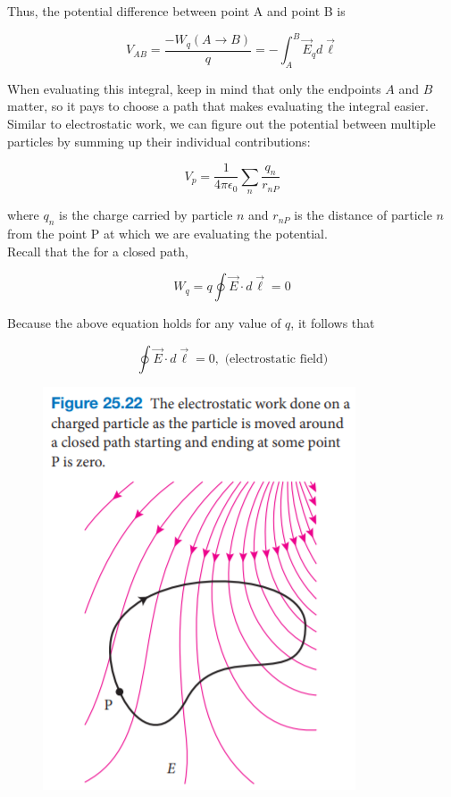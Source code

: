         Thus, the potential difference between point A and point B is

        \[
            V_{AB} = \frac{-W_q (A\to B)}{q} = -\int_A^B \vec{E}_q d\vec{\ell}
        \]

        When evaluating this integral, keep in mind that only the endpoints $A$ and $B$ matter, so it pays to choose a path that makes evaluating the integral easier. \\

        Similar to electrostatic work, we can figure out the potential between multiple particles by summing up their individual contributions:

        \[
            V_p = \frac{1}{4\pi\epsilon_0} \sum_n \frac{q_n}{r_{nP}}
        \]

        where $q_n$ is the charge carried by particle $n$ and $r_{nP}$ is the distance of particle $n$ from the point P at which we are evaluating the potential.  \\

        Recall that the for a closed path,

        \[
            W_q = q\oint \vec{E}\cdot d\vec{\ell} = 0
        \]

        Because the above equation holds for any value of $q$, it follows that

        \[
            \oint \vec{E}\cdot d\vec{\ell} = 0, \text{ (electrostatic field)}
        \]

        \begin{figure}[hbt!]
            \centering
            \includegraphics[scale = 0.75]{Resources/25.5_Electrostatic_Work_Movement}
        \end{figure}

